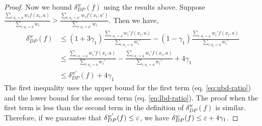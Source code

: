 \begin{proof}
Now we bound $\delta^w_{DP}(f)$ using the results above. Suppose $\frac{\sum_{i: a_i = a} w_i f(x_i,a)}{\sum_{i: a_i = a} w_i} >  \frac{\sum_{i: a_i = a'} w_i f(x_i,a')}{\sum_{i: a_i = a'} w_i}$. Then we have,
\begin{align*}
\delta^w_{DP}(f) &\le (1+3\gamma_1)  \frac{\sum_{i: a_i = a} w_i' f(x_i,a)}{\sum_{i: a_i = a} w_i'} - (1-\gamma_1) \frac{\sum_{i: a_i = a} w_i' f(x_i,a)}{\sum_{i: a_i = a} w_i'}  \\
&\le  \frac{\sum_{i: a_i = a} w_i' f(x_i,a)}{\sum_{i: a_i = a} w_i'} -  \frac{\sum_{i: a_i = a} w_i' f(x_i,a)}{\sum_{i: a_i = a} w_i'} + 4\gamma_1\\
&\le \delta^{w'}_{DP}(f) + 4\gamma_1
\end{align*}
The first inequality uses the upper bound for the first term (eq. \ref{eq:ubd-ratio}) and the lower bound for the second term (eq. \ref{eq:lbd-ratio}). The proof when the first term is less than the second term in the definition of $\delta^w_{DP}(f)$ is similar. Therefore, if we guarantee that $\delta^{w'}_{DP}(f) \le \varepsilon$, we have $\delta^w_{DP}(f) \le \varepsilon+4\gamma_1$.
\end{proof}

